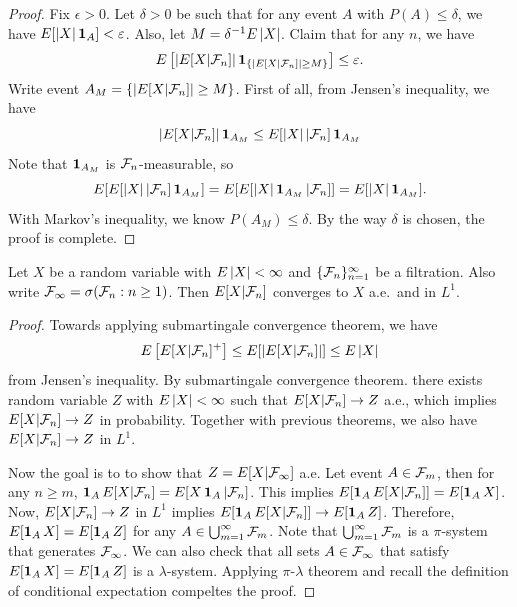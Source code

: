\documentclass[a4paper]{article}
\begin{document}
\begin{proof}
  Fix $\epsilon > 0$. Let $\delta > 0$ be such that for any event $A$
  with $P(A) \leq \delta$, we have $E [\left\lvert X\right\rvert \operatorname{\mathbf{1}}_A] < \varepsilon$. 
  Also, let $M = \delta^{-1} E \left\lvert X\right\rvert$. Claim that for 
  any $n$, we have 
  \[
  E \left[ \left\lvert E [X | \mathcal{F}_n]\right\rvert \operatorname{\mathbf{1}}_{\{\left\lvert E[X | \mathcal{F}_n]\right\rvert \geq M\}}\right] 
  \leq \varepsilon.
  \]
  Write event $A_M = \{\left\lvert E[X | \mathcal{F}_n]\right\rvert \geq M\}$. First of all, 
  from Jensen's inequality, we have 
  \[
  \left\lvert E [X | \mathcal{F}_n]\right\rvert \operatorname{\mathbf{1}}_{A_M} 
  \leq E[\left\lvert X\right\rvert | \mathcal{F}_n] \operatorname{\mathbf{1}}_{A_M}
  \]
  Note that $\operatorname{\mathbf{1}}_{A_M}$ is $\mathcal{F}_n$-measurable, so 
  \[
  E[ E[\left\lvert X\right\rvert | \mathcal{F}_n] \operatorname{\mathbf{1}}_{A_M} ] 
  = E[ E[\left\lvert X\right\rvert \operatorname{\mathbf{1}}_{A_M} | \mathcal{F}_n] ]
  = E [\left\lvert X\right\rvert \operatorname{\mathbf{1}}_{A_M}].
  \]
  With Markov's inequality, we know $P(A_M) \leq \delta$.
  By the way $\delta$ is chosen, the proof is complete.

\end{proof}

\begin{thm}
  Let $X$ be a random variable with $E \left\lvert X\right\rvert < \infty$ and 
  $\{ \mathcal{F}_n \}_{n=1}^\infty$ be a filtration.
  Also write $\mathcal{F}_\infty = \sigma (\mathcal{F}_n : n \geq 1)$.
  Then $E[X | \mathcal{F}_n]$ converges to $X$ a.e.\ and in $L^1$.
\end{thm}

\begin{proof}
  Towards applying submartingale convergence theorem, we have
  \begin{align*}
    E \left[ E[X | \mathcal{F}_n]^+ \right] 
    \leq E [ \left\lvert  E[ X | \mathcal{F}_n] \right\rvert ] \leq E \left\lvert X\right\rvert
  \end{align*}
  from Jensen's inequality. By submartingale convergence theorem. 
  there exists random variable $Z$ with $E \left\lvert X\right\rvert < \infty$ 
  such that $E [X | \mathcal{F}_n] \to Z$ a.e., which implies 
  $E [X | \mathcal{F}_n] \to Z$ in probability. Together with previous 
  theorems, we also have $E [X | \mathcal{F}_n] \to Z$ in $L^1$.

  Now the goal is to to show that $Z = E [X | \mathcal{F}_\infty]$ 
  a.e. Let event $A \in \mathcal{F}_m$, then for any $n \geq m$, 
  $\operatorname{\mathbf{1}}_A E[X | \mathcal{F}_n] = E [X \operatorname{\mathbf{1}}_{A} | \mathcal{F}_n]$.
  This implies $E [\operatorname{\mathbf{1}}_A E [X | \mathcal{F}_n]] = E [\operatorname{\mathbf{1}}_A X]$. 
  Now, $E [X | \mathcal{F}_n] \to Z$ in $L^1$ implies 
  $E [\operatorname{\mathbf{1}}_A E [X | \mathcal{F}_n]] \to E [\operatorname{\mathbf{1}}_A Z]$. Therefore, 
  $E [\operatorname{\mathbf{1}}_A X] = E [\operatorname{\mathbf{1}}_A Z]$ for any $A \in
  \bigcup_{m=1}^\infty \mathcal{F}_m$. Note that $\bigcup_{m=1}^\infty \mathcal{F}_m$ is a $\pi$-system 
  that generates $\mathcal{F}_\infty$. We can also check that 
  all sets $A \in \mathcal{F}_\infty$ that satisfy 
  $E[\operatorname{\mathbf{1}}_A X] = E [\operatorname{\mathbf{1}}_A Z]$ is a $\lambda$-system. 
  Applying $\pi$-$\lambda$ theorem and recall the 
  definition of conditional expectation compeltes the proof.

\end{proof}
\end{document}
